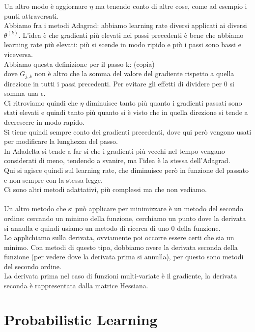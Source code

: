 \documentclass[12pt, oneside]{extbook}
\begin{document}
Un altro modo è aggiornare $\eta$ ma tenendo conto di altre cose, come ad esempio i punti attraversati.\\Abbiamo fra i metodi Adagrad: abbiamo learning rate diversi applicati ai diversi $\theta^{(k)}$. L'idea è che gradienti più elevati nei passi precedenti è bene che abbiamo learning rate più elevati: più si scende in modo ripido e più i passi sono bassi e viceversa.\\Abbiamo questa definizione per il passo k: (copia)
\\dove $G_{j,k}$ non è altro che la somma del valore del gradiente rispetto a quella direzione in tutti i passi precedenti. Per evitare gli effetti di dividere per 0 si somma una $\epsilon$.\\Ci ritroviamo quindi che $\eta$ diminuisce tanto più quanto i gradienti passati sono stati elevati e quindi tanto più quanto si è visto che in quella direzione si tende a decrescere in modo rapido.\\Si tiene quindi sempre conto dei gradienti precedenti, dove qui però vengono usati per modificare la lunghezza del passo.\\In Adadelta si tende a far si che i gradienti più vecchi nel tempo vengano considerati di meno, tendendo a svanire, ma l'idea è la stessa dell'Adagrad.\\Qui si agisce quindi sul learning rate, che diminuisce però in funzione del passato e non sempre con la stessa legge.\\Ci sono altri metodi adattativi, più complessi ma che non vediamo.\\\\Un altro metodo che si può applicare per minimizzare è un metodo del secondo ordine: cercando un minimo della funzione, cerchiamo un punto dove la derivata si annulla e quindi usiamo un metodo di ricerca di uno 0 della funzione.\\Lo applichiamo sulla derivata, ovviamente poi occorre essere certi che sia un minimo. Con metodi di questo tipo, dobbiamo avere la derivata seconda della funzione (per vedere dove la derivata prima si annulla), per questo sono metodi del secondo ordine.\\La derivata prima nel caso di funzioni multi-variate è il gradiente, la derivata seconda è rappresentata dalla matrice Hessiana.

\chapter{Probabilistic Learning}
\end{document}
